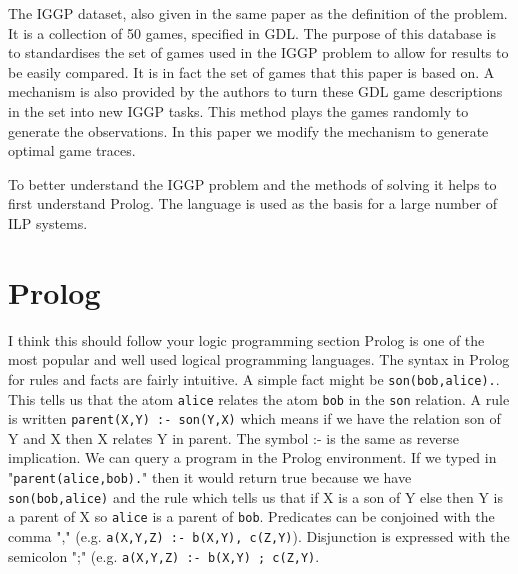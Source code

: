 The IGGP dataset, also given in the same paper as the definition of the problem. It is a collection of 50 games, specified in GDL. The purpose of this database is to standardises the set of games used in the IGGP problem to allow for results to be easily compared. It is in fact the set of games that this paper is based on.
A mechanism is also provided by the authors to turn these GDL game descriptions in the set into new IGGP tasks. This method plays the games randomly to generate the observations. In this paper we modify the mechanism to generate optimal game traces.

To better understand the IGGP problem and the methods of solving it helps to first understand Prolog. The language is used as the basis for a large number of ILP systems\cite{Metagol/Github,Muggleton/Aleph,Ahlgren/Atom}.


\section{Prolog}\label{sec:prolog}
\ac{I think this should follow your logic programming section}
Prolog is one of the most popular and well used logical programming languages. The syntax in Prolog for rules and facts are fairly intuitive. A simple fact might be \texttt{son(bob,alice).}. This tells us that the atom \texttt{alice} relates the atom \texttt{bob} in the \texttt{son} relation. A rule is written \texttt{parent(X,Y) :- son(Y,X)} which means if we have the relation son of Y and X then X relates Y in parent. The symbol :- is the same as reverse implication. We can query a program in the Prolog environment. If we typed in "\texttt{parent(alice,bob).}" then it would return true because we have \texttt{son(bob,alice)} and the rule which tells us that if X is a son of Y else then Y is a parent of X so \texttt{alice} is a parent of \texttt{bob}. Predicates can be conjoined with the comma "," (e.g. \texttt{a(X,Y,Z) :- b(X,Y), c(Z,Y)}). Disjunction is expressed with the semicolon ";" (e.g. \texttt{a(X,Y,Z) :- b(X,Y) ; c(Z,Y)}\cite{Bratko}.


